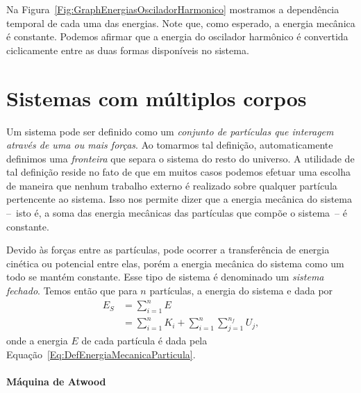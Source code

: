 Na Figura~\ref{Fig:GraphEnergiasOsciladorHarmonico} mostramos a dependência temporal de cada uma das energias. Note que, como esperado, a energia mecânica é constante. Podemos afirmar que a energia do oscilador harmônico é convertida ciclicamente entre as duas formas disponíveis no sistema.



\section{Sistemas com múltiplos corpos}
\label{Sec:Sistemas}

Um sistema pode ser definido como um \emph{conjunto de partículas que interagem através de uma ou mais forças}. Ao tomarmos tal definição, automaticamente definimos uma \emph{fronteira} que separa o sistema do resto do universo. A utilidade de tal definição reside no fato de que em muitos casos podemos efetuar uma escolha de maneira que nenhum trabalho externo é realizado sobre qualquer partícula pertencente ao sistema. Isso nos permite dizer que a energia mecânica do sistema --~isto é, a soma das energia mecânicas das partículas que compõe o sistema~-- é constante.

Devido às forças entre as partículas, pode ocorrer a transferência de energia cinética ou potencial entre elas, porém a energia mecânica do sistema como um todo se mantém constante. Esse tipo de sistema é denominado um \emph{sistema fechado}. Temos então que para $n$ partículas, a energia do sistema e dada por
\begin{align}
    E_S &= \sum_{i = 1}^{n} E\\
    &= \sum_{i = 1}^{n} K_i + \sum_{i = 1}^n \sum_{j = 1}^{n_f} U_j,
\end{align}
%
onde a energia $E$ de cada partícula é dada pela Equação~\ref{Eq:DefEnergiaMecanicaParticula}.

\paragraph{Máquina de Atwood}

